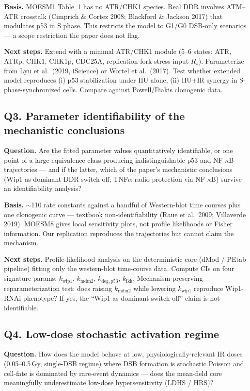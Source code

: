 \textbf{Basis.} MOESM1 Table~1 has no ATR/CHK1 species. Real DDR involves
ATM--ATR crosstalk (Cimprich \& Cortez 2008; Blackford \& Jackson 2017) that
modulates p53 in S phase. This restricts the model to G1/G0 DSB-only scenarios
--- a scope restriction the paper does not flag.

\textbf{Next steps.} Extend with a minimal ATR/CHK1 module (5--6 states: ATR,
ATRp, CHK1, CHK1p, CDC25A, replication-fork stress input $R_s$).
Parameterize from Lyu et al.\ (2019, iScience) or Wortel et al.\ (2017).
Test whether extended model reproduces (i) p53 stabilization under HU alone,
(ii) HU$+$IR synergy in S-phase-synchronized cells. Compare against
Powell/Iliakis clonogenic data.

\subsection*{Q3. Parameter identifiability of the mechanistic conclusions}
\textbf{Question.} Are the fitted parameter values quantitatively
identifiable, or one point of a large equivalence class producing
indistinguishable p53 and NF-$\kappa$B trajectories --- and if the latter,
which of the paper's mechanistic conclusions (Wip1 as dominant DDR switch-off;
TNF$\alpha$ radio-protection via NF-$\kappa$B) survive an identifiability
analysis?

\textbf{Basis.} $\sim$110 rate constants against a handful of Western-blot
time courses plus one clonogenic curve --- textbook non-identifiability
(Raue et al.\ 2009; Villaverde 2019). MOESM8 gives local sensitivity plots,
not profile likelihoods or Fisher information. Our replication reproduces the
trajectories but cannot claim the mechanism.

\textbf{Next steps.} Profile-likelihood analysis on the deterministic core
(dMod / PEtab pipeline) fitting only the western-blot time-course data.
Compute CIs on four signature params: $k_{\mathrm{wip1}}$,
$k_{\mathrm{mdm2}}$, $k_{\mathrm{deg,p53}}$, $k_{\mathrm{ikk}}$.
Mechanism-preserving reparameterization test: does raising $k_{\mathrm{mdm2}}$
while lowering $k_{\mathrm{wip1}}$ reproduce Wip1-RNAi phenotype? If yes, the
``Wip1-as-dominant-switch-off'' claim is not identifiable.

\subsection*{Q4. Low-dose stochastic activation regime}
\textbf{Question.} How does the model behave at low, physiologically-relevant
IR doses (0.05--0.5\,Gy, single-DSB regime) where DSB formation is stochastic
Poisson and cell-fate is dominated by rare-event dynamics --- does the
mean-field core meaningfully underestimate low-dose hypersensitivity
(LDHS / HRS)?

